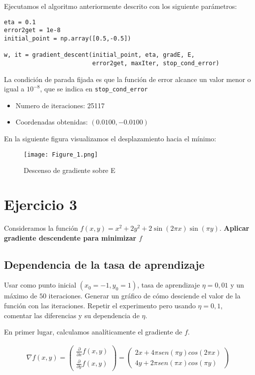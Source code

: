 Ejecutamos el algoritmo anteriormente descrito con los siguiente parámetros:

\begin{verbatim}
eta = 0.1 
error2get = 1e-8
initial_point = np.array([0.5,-0.5])

w, it = gradient_descent(initial_point, eta, gradE, E, 
                         error2get, maxIter, stop_cond_error)
\end{verbatim}

La condición de parada fijada es que la función de error alcance un valor
menor o igual a $10^{-8}$, que se indica en \texttt{stop_cond_error}

\begin{itemize}
\item Numero de iteraciones: 25117
\item Coordenadas obtenidas: $(0.0100 ,  -0.0100)$
\end{itemize}


En la siguiente figura visualizamos el desplazamiento hacia el mínimo: 

\begin{figure}[H]
\centering
\texttt{[image: Figure\_1.png]}
\caption{Descenso de gradiente sobre E}
\end{figure}

\section{Ejercicio 3}

Consideramos la función  $f(x,y) = x^2 + 2y^2 + 2 \sin (2 \pi x) \sin (\pi y)$.
\textbf{Aplicar gradiente descendente para minimizar $f$}

\subsection{Dependencia de la tasa de aprendizaje}

Usar como punto inicial $(x_0 = -1, y_0 = 1)$, tasa de aprendizaje $\eta = 0,01$
y un máximo de $50$ iteraciones. Generar un gráfico de cómo desciende el valor
de la función con las iteraciones. Repetir el experimento pero usando 
$\eta =0,1$, comentar las diferencias y su dependencia de $\eta$.  

En primer lugar, calculamos analíticamente el gradiente de $f$.

\begin{equation}
\begin{aligned}
  \nabla f(x,y) = \begin{pmatrix}
  \frac{\partial }{\partial x} f(x,y) \\
  \frac{\partial }{\partial y} f(x,y)
  \end{pmatrix} = \begin{pmatrix}
   2x + 4\pi sen(\pi y)cos(2\pi x) \\
   4y + 2\pi sen(\pi x)cos(\pi y)
  \end{pmatrix}
\end{aligned}
\end{equation}

